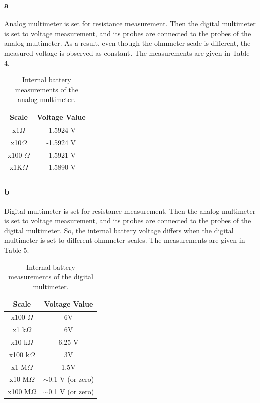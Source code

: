 \documentclass[letterpaper,12pt]{article}
\begin{document}
\subsubsection{a}
Analog multimeter is set for resistance measurement. Then the digital multimeter is set to voltage measurement, and its probes are connected to the probes of the analog multimeter. As a result, even though the ohmmeter scale is different, the measured voltage is observed as constant. The measurements are given in Table 4.
\begin{table}[H]
	\begin{center}
	\caption{Internal battery measurements of the analog multimeter.}	
	\vspace{2mm}
	\begin{tabular}{|| c | c ||}
	\hline
	Scale              & Voltage Value \\[0.5ex] 
	\hline\hline
	x1\( \Omega \)   & -1.5924 V     \\
	\hline
	x10\( \Omega \)  & -1.5924 V     \\
	\hline
	x100 \( \Omega \) & -1.5921 V     \\
	\hline
	x1K\( \Omega \)  & -1.5890 V   \\
	\hline
	\end{tabular}
	
\end{center}
\end{table}

\subsubsection{b}
Digital multimeter is set for resistance measurement. Then the analog multimeter is set to voltage measurement, and its probes are connected to the probes of the digital multimeter. So, the internal battery voltage differs when the digital multimeter is set to different ohmmeter scales. The measurements are given in Table 5.
\begin{table}[H]
	\centering
	\caption{Internal battery measurements of the digital multimeter.}
	\vspace{2mm}
	\begin{tabular}{|| c | c ||}
		\hline
	Scale & Voltage Value \\\hline
	\hline
	x100 \( \Omega \) & 6V \\\hline
	x1 k\( \Omega \) & 6V \\\hline
	x10 k\( \Omega \) & 6.25 V \\\hline
	x100 k\( \Omega \) & 3V \\\hline
	x1 M\( \Omega \) & 1.5V \\\hline
	x10 M\( \Omega \) & $\sim$0.1 V (or zero) \\\hline
	x100 M\( \Omega \) & $\sim$0.1 V (or zero) \\\hline
	\end{tabular}
	
\end{table}
\end{document}
